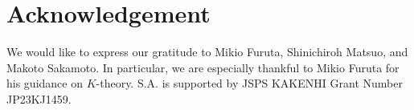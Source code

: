 \documentclass[11pt]{article}
\newcommand{\fix}[1]{\textcolor{red}{[#1]}}
\begin{document}

\section*{Acknowledgement}
We would like to express our gratitude to Mikio Furuta, Shinichiroh Matsuo, and Makoto Sakamoto. In particular, we are especially thankful to Mikio Furuta for his guidance on $K$-theory. S.A. is supported by JSPS KAKENHI Grant Number JP23KJ1459.




\end{document}
